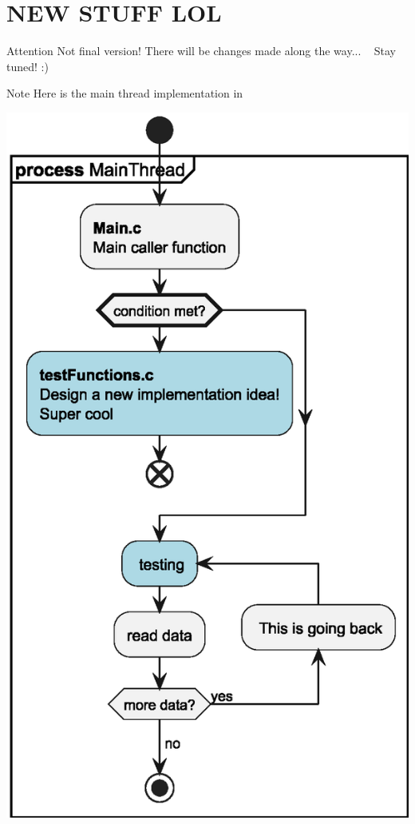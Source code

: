 \chapter{NEW STUFF LOL}
\hypertarget{_a_d_d_i_n_g}{}\label{_a_d_d_i_n_g}
\begin{DoxyAttention}{Attention}
Not final version! There will be changes made along the way... ~\newline
 Stay tuned! \+:)
\end{DoxyAttention}
\begin{DoxyNote}{Note}
Here is the main thread implementation in 
\end{DoxyNote}

\begin{DoxyImageNoCaption}
  \mbox{\includegraphics[width=\textwidth,height=\textheight/2,keepaspectratio=true]{inline_umlgraph_2}}
\end{DoxyImageNoCaption}
 